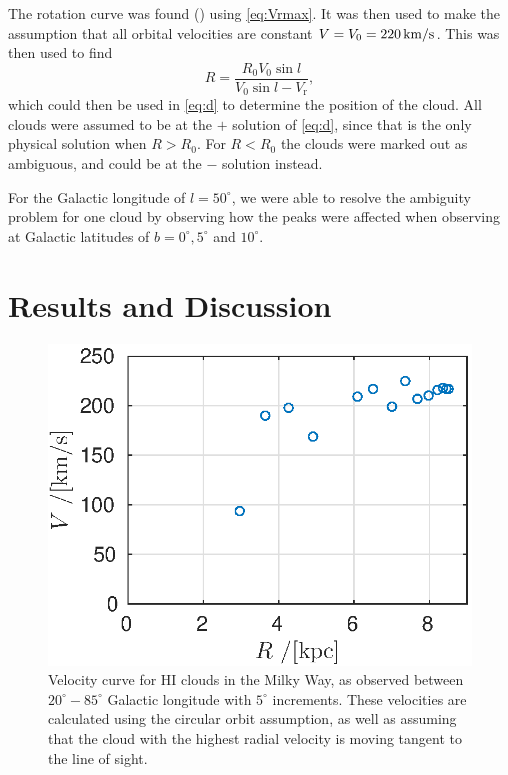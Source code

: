\documentclass[11pt,a4paper, twocolumn,
swedish, english %
]{article}
\newcommand{\rr}{\mathrm{r}}
\begin{document}
The rotation curve was found () using
\eqref{eq:Vrmax}. It was then used to make the assumption that all 
orbital velocities are constant $V=V_0=\unit[220]{km/s}$. This was
then used to find 
\begin{equation}\label{eq:R}
R=\frac{R_0V_0\sin l}{V_0\sin l -V_\rr}, 
\end{equation}
which could then be used in \eqref{eq:d} to determine the position of
the cloud. All clouds were assumed to be at the $+$ solution of
\eqref{eq:d}, since that is the only physical solution when
$R>R_0$. For $R<R_0$ the clouds were marked out as ambiguous, and could
be at the $-$ solution instead.

For the Galactic longitude of $l=50^\circ$, we were able to resolve
the ambiguity problem for one cloud by observing how the peaks were
affected when observing at Galactic latitudes of $b=0^\circ, 5^\circ$
and $10^\circ$. 

\section{Results and Discussion}
\begin{figure}\centering
\includegraphics[width=1\linewidth]{rotation_curve.eps}
\caption{Velocity curve for HI clouds in the Milky Way, as observed
  between $20^\circ{-}85^\circ$ Galactic longitude with $5^\circ$
  increments. These velocities are calculated using the circular orbit
  assumption, as well as assuming that the cloud with the highest
  radial velocity is moving tangent to the line of sight.}
\label{fig:rot}
\end{figure}
\end{document}
